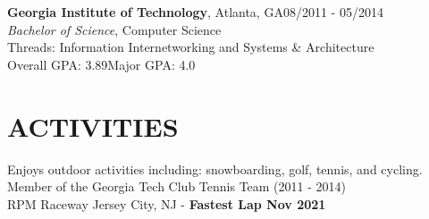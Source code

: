 \documentclass[margin,11pt]{res}
\begin{document}
\begin{resume}
\textbf{Georgia Institute of Technology}, Atlanta, GA\hfill 08/2011 - 05/2014\\
{\sl Bachelor of Science}, Computer Science\\
Threads: Information Internetworking and Systems \& Architecture\\
Overall GPA: 3.89\hspace{10mm}Major GPA: 4.0

\section{ACTIVITIES}
Enjoys outdoor activities including: snowboarding, golf, tennis, and cycling.\\
Member of the Georgia Tech Club Tennis Team (2011 - 2014)\\
RPM Raceway Jersey City, NJ - \textbf{Fastest Lap Nov 2021}

\end{resume}
\end{document}
